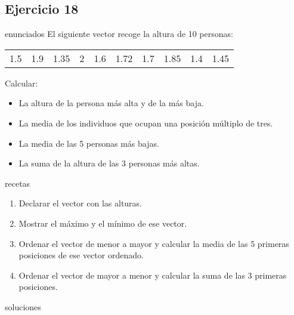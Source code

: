 \subsection{Ejercicio 18}
\def\parte{enunciados}
\ifx\capitulo\parte
El siguiente vector recoge la altura de 10 personas:
\begin{center}
  \begin{tabular}[h]{cccccccccc}
    1.5&1.9&1.35&2&1.6&1.72&1.7&1.85&1.4&1.45
  \end{tabular}
\end{center}

Calcular:

\begin{itemize}
\item La altura de la persona más alta y de la más baja.
\item La media de los individuos que ocupan una posición múltiplo de tres.
\item La media de las 5 personas más bajas.
\item La suma de la altura de las 3 personas más altas.
\end{itemize}
\fi

\def\parte{recetas}
\ifx\capitulo\parte
\begin{enumerate}
\item Declarar el vector con las alturas.
\item Mostrar el máximo y el mínimo de ese vector.
\item Ordenar el vector de menor a mayor y calcular la media de las 5 primeras posiciones de ese vector ordenado.
\item Ordenar el vector de mayor a menor y calcular la suma de las 3 primeras posiciones.
\end{enumerate}
\fi

\def\parte{soluciones}
\ifx\capitulo\parte

\fi
